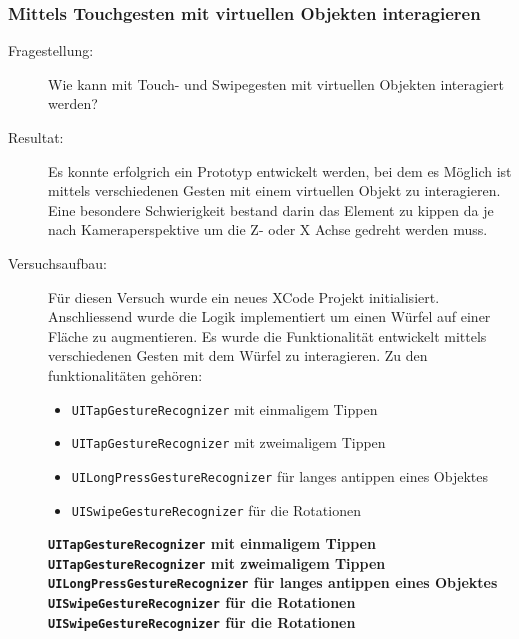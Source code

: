 \subsubsection{Mittels Touchgesten mit virtuellen Objekten interagieren}
\begin{description}
	\item[Fragestellung:] Wie kann mit Touch- und Swipegesten mit virtuellen Objekten interagiert werden?
	\item[Resultat:] Es konnte erfolgrich ein Prototyp entwickelt werden, bei dem es Möglich ist mittels verschiedenen Gesten mit einem virtuellen Objekt zu interagieren. Eine besondere Schwierigkeit bestand darin das Element zu kippen da je nach Kameraperspektive um die Z- oder X Achse gedreht werden muss. 
    \item[Versuchsaufbau:] Für diesen Versuch wurde ein neues XCode Projekt initialisiert. Anschliessend wurde die Logik implementiert um einen Würfel auf einer Fläche zu augmentieren. Es wurde die Funktionalität entwickelt mittels verschiedenen Gesten mit dem Würfel zu interagieren. Zu den funktionalitäten gehören:
    
    \begin{itemize}
        \item \texttt{UITapGestureRecognizer} mit einmaligem Tippen
        \item \texttt{UITapGestureRecognizer} mit zweimaligem Tippen
        \item \texttt{UILongPressGestureRecognizer} für langes antippen eines Objektes
        \item \texttt{UISwipeGestureRecognizer} für die Rotationen
    \end{itemize}


    \textbf{\texttt{UITapGestureRecognizer} mit einmaligem Tippen}\\

    \textbf{\texttt{UITapGestureRecognizer} mit zweimaligem Tippen}\\

    \textbf{\texttt{UILongPressGestureRecognizer} für langes antippen eines Objektes}\\

    \textbf{\texttt{UISwipeGestureRecognizer} für die Rotationen}\\

    \textbf{\texttt{UISwipeGestureRecognizer} für die Rotationen}\\


    

\end{description}    
